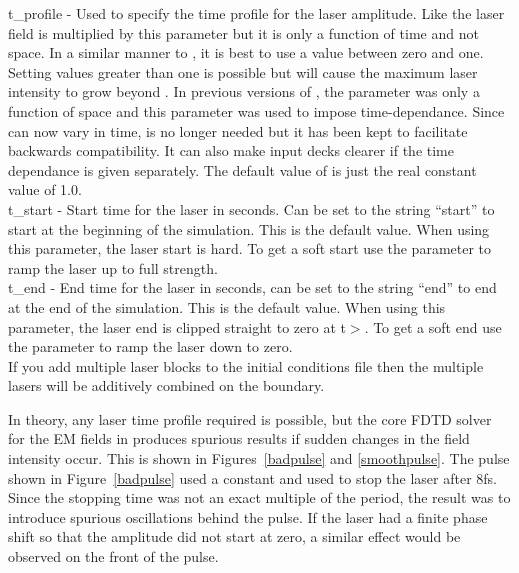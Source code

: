 {\emphtext t\_profile} - Used to specify the time profile for the laser
  amplitude. Like  the laser field is multiplied by
  this parameter but it is only a function of time and not space.
  In a similar manner to , it is best to use a value
  between zero and one.  Setting values greater than one is possible but will
  cause the maximum laser intensity to grow beyond .
  In previous
  versions of {\EPOCH}, the  parameter was only a function
  of space and this parameter was used to impose time-dependance. Since
   can now vary in time,  is no
  longer needed but it has been kept to facilitate backwards compatibility. It
  can also make input decks clearer if the time dependance is given separately.
  The default value of  is just the real constant
  value of 1.0.\\

{\emphtext t\_start} - Start time for the laser in seconds. Can be set to the
  string ``start'' to start at the beginning of the simulation. This is the
  default value. When using this parameter, the laser start is hard. To get a
  soft start use the  parameter to ramp the laser up to
  full strength.\\

{\emphtext t\_end} - End time for the laser in seconds, can be set to the
  string ``end'' to end at the end of the simulation. This is the default value.
  When using this parameter, the laser end is clipped straight to zero at
  t$>$. To get a soft end use the 
  parameter to ramp the laser down to zero.\\

If you add multiple laser blocks to the initial conditions file then the
multiple lasers will be additively combined on the boundary.

In theory, any laser time profile required is possible, but the core FDTD
solver for the EM fields in {\EPOCH} produces spurious results if sudden
changes in the field intensity occur. This is shown in Figures~\ref{badpulse}
and \ref{smoothpulse}. The pulse shown in Figure~\ref{badpulse} used a constant
 and used  to stop the laser after
8fs. Since the stopping time was not an exact multiple of the period, the
result was to introduce spurious oscillations behind the pulse. If the laser
had a finite phase shift so that the amplitude did not start at zero, a
similar effect would be observed on the front of the pulse.

